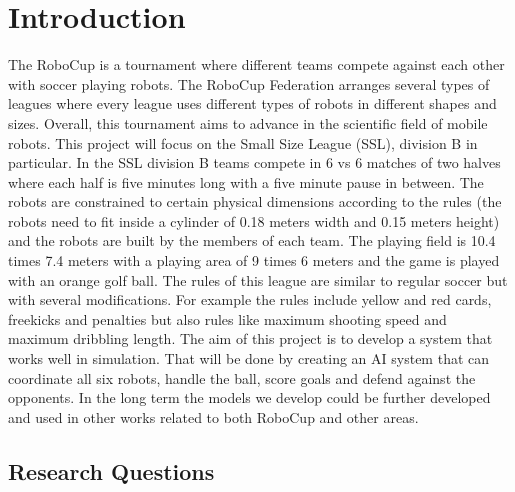 \section{Introduction}
\label{section:intro}

The RoboCup \cite{RoboCupSSL} is a tournament where different teams compete against each other with soccer playing robots. The RoboCup Federation arranges several types of leagues where every league uses different types of robots in different shapes and sizes. Overall, this tournament aims to advance in the scientific field of mobile robots. 
This project will focus on the Small Size League (SSL), division B in particular. In the SSL division B teams compete in 6 vs 6 matches of two halves where each half is five minutes long with a five minute pause in between. The robots are constrained to certain physical dimensions according to the rules (the robots need to fit inside a cylinder of 0.18 meters width and 0.15 meters height) and the robots are built by the members of each team. The playing field is 10.4 times 7.4 meters with a playing area of 9 times 6 meters and the game is played with an orange golf ball. The rules of this league are similar to regular soccer but with several modifications. For example the rules include yellow and red cards, freekicks and penalties but also rules like maximum shooting speed and maximum dribbling length. 
The aim of this project is to develop a system that works well in simulation. That will be done by creating an AI system that can coordinate all six robots, handle the ball, score goals and defend against the opponents. In the long term the models we develop could be further developed and used in other works related to both RoboCup and other areas.

\subsection{Research Questions}
